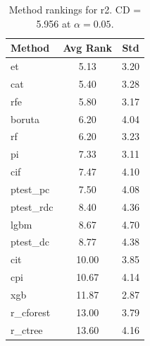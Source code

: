 \begin{table}[h]
\centering
\caption{Method rankings for r2. CD = 5.956 at $\alpha=0.05$.}
\label{tab:ranks_r2}
\begin{tabular}{lcc}
\toprule
Method & Avg Rank & Std \\
\midrule
et & 5.13 & 3.20 \\
cat & 5.40 & 3.28 \\
rfe & 5.80 & 3.17 \\
boruta & 6.20 & 4.04 \\
rf & 6.20 & 3.23 \\
pi & 7.33 & 3.11 \\
cif & 7.47 & 4.10 \\
ptest_pc & 7.50 & 4.08 \\
ptest_rdc & 8.40 & 4.36 \\
lgbm & 8.67 & 4.70 \\
ptest_dc & 8.77 & 4.38 \\
cit & 10.00 & 3.85 \\
cpi & 10.67 & 4.14 \\
xgb & 11.87 & 2.87 \\
r_cforest & 13.00 & 3.79 \\
r_ctree & 13.60 & 4.16 \\
\bottomrule
\end{tabular}
\end{table}